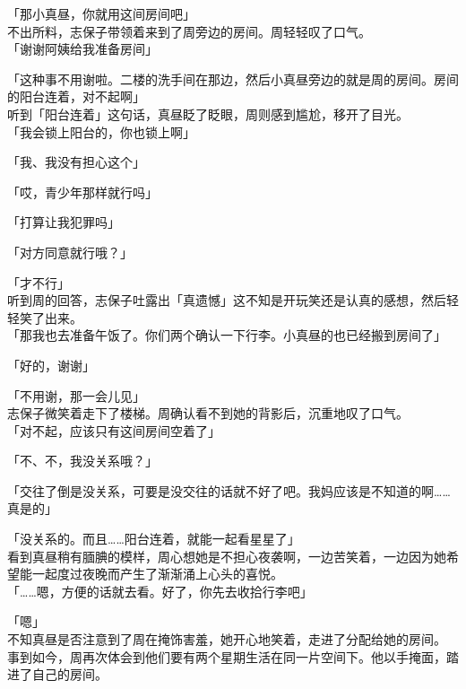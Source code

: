 「那小真昼，你就用这间房间吧」\\

不出所料，志保子带领着来到了周旁边的房间。周轻轻叹了口气。\\

「谢谢阿姨给我准备房间」

「这种事不用谢啦。二楼的洗手间在那边，然后小真昼旁边的就是周的房间。房间的阳台连着，对不起啊」\\

听到「阳台连着」这句话，真昼眨了眨眼，周则感到尴尬，移开了目光。\\

「我会锁上阳台的，你也锁上啊」

「我、我没有担心这个」

「哎，青少年那样就行吗」

「打算让我犯罪吗」

「对方同意就行哦？」

「才不行」\\

听到周的回答，志保子吐露出「真遗憾」这不知是开玩笑还是认真的感想，然后轻轻笑了出来。\\

「那我也去准备午饭了。你们两个确认一下行李。小真昼的也已经搬到房间了」

「好的，谢谢」

「不用谢，那一会儿见」\\

志保子微笑着走下了楼梯。周确认看不到她的背影后，沉重地叹了口气。\\

「对不起，应该只有这间房间空着了」

「不、不，我没关系哦？」

「交往了倒是没关系，可要是没交往的话就不好了吧。我妈应该是不知道的啊……真是的」

「没关系的。而且……阳台连着，就能一起看星星了」\\

看到真昼稍有腼腆的模样，周心想她是不担心夜袭啊，一边苦笑着，一边因为她希望能一起度过夜晚而产生了渐渐涌上心头的喜悦。\\

「……嗯，方便的话就去看。好了，你先去收拾行李吧」

「嗯」\\

不知真昼是否注意到了周在掩饰害羞，她开心地笑着，走进了分配给她的房间。\\

事到如今，周再次体会到他们要有两个星期生活在同一片空间下。他以手掩面，踏进了自己的房间。\\


